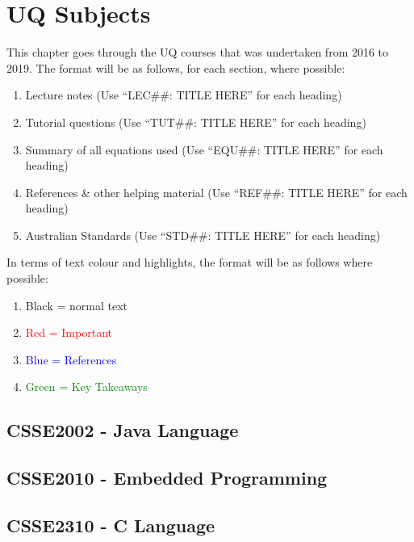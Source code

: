 \pagestyle{fancy}
\fancyfoot[R]{\thepage}
\renewcommand{\headrulewidth}{0.4pt}
\renewcommand{\footrulewidth}{2pt}

\section{UQ Subjects} %
This chapter goes through the UQ courses that was undertaken from 2016 to 2019. The format will be as follows, for each section, where possible:
\begin{enumerate}
  \item Lecture notes (Use ``LEC\#\#: TITLE HERE'' for each heading)
  \item Tutorial questions (Use ``TUT\#\#: TITLE HERE'' for each heading)
  \item Summary of all equations used (Use ``EQU\#\#: TITLE HERE'' for each heading)
  \item References \& other helping material (Use ``REF\#\#: TITLE HERE'' for each heading)
  \item Australian Standards (Use ``STD\#\#: TITLE HERE'' for each heading)
\end{enumerate}

In terms of text colour and highlights, the format will be as follows where possible:
\begin{enumerate}
  \item Black = normal text
  \item \textcolor{red}{Red = Important}
  \item \textcolor{blue}{Blue = References}
  \item \textcolor{green}{Green = Key Takeaways}
\end{enumerate}

\subsection{CSSE2002 - Java Language}
\clearpage

\subsection{CSSE2010 - Embedded Programming}
\clearpage

\subsection{CSSE2310 - C Language}
\clearpage

